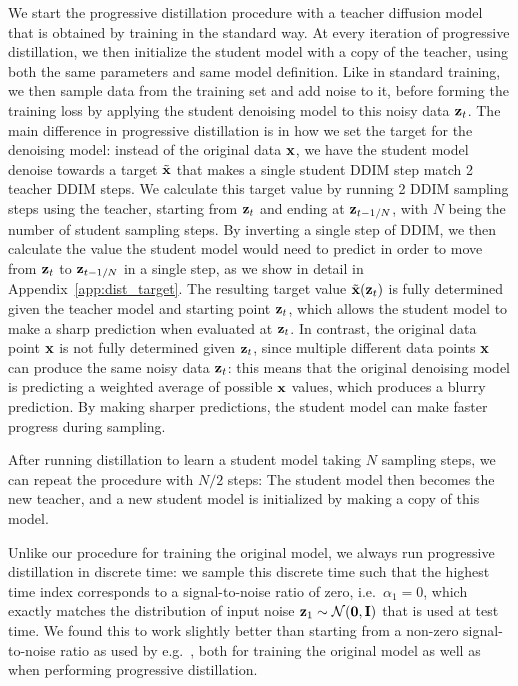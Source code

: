 \documentclass[hidelinks]{article} %
\begin{document}
We start the progressive distillation procedure with a teacher diffusion model that is obtained by training in the standard way. At every iteration of progressive distillation, we then initialize the student model with a copy of the teacher, using both the same parameters and same model definition. Like in standard training, we then sample data from the training set and add noise to it, before forming the training loss by applying the student denoising model to this noisy data ${\mathbf{z}}_t$. The main difference in progressive distillation is in how we set the target for the denoising model: instead of the original data ${\mathbf{x}}$, we have the student model denoise towards a target $\tilde{{\mathbf{x}}}$ that makes a single student DDIM step match 2 teacher DDIM steps. We calculate this target value by running 2 DDIM sampling steps using the teacher, starting from ${\mathbf{z}}_t$ and ending at ${\mathbf{z}}_{t-1/N}$, with $N$ being the number of student sampling steps. By inverting a single step of DDIM, we then calculate the value the student model would need to predict in order to move from ${\mathbf{z}}_t$ to ${\mathbf{z}}_{t-1/N}$ in a single step, as we show in detail in Appendix~\ref{app:dist_target}. The resulting target value $\tilde{{\mathbf{x}}}({\mathbf{z}}_t)$ is fully determined given the teacher model and starting point ${\mathbf{z}}_t$, which allows the student model to make a sharp prediction when evaluated at ${\mathbf{z}}_t$. In contrast, the original data point ${\mathbf{x}}$ is not fully determined given ${\mathbf{z}}_t$, since multiple different data points ${\mathbf{x}}$ can produce the same noisy data ${\mathbf{z}}_t$: this means that the original denoising model is predicting a weighted average of possible ${\mathbf{x}}$ values, which produces a blurry prediction. By making sharper predictions, the student model can make faster progress during sampling.

After running distillation to learn a student model taking $N$ sampling steps, we can repeat the procedure with $N/2$ steps: The student model then becomes the new teacher, and a new student model is initialized by making a copy of this model.

Unlike our procedure for training the original model, we always run progressive distillation in discrete time: we sample this discrete time such that the highest time index corresponds to a signal-to-noise ratio of zero, i.e.\ $\alpha_{1} = 0$, which exactly matches the distribution of input noise $\mathbf{z}_1 \sim \mathcal{N}(\mathbf{0}, \mathbf{I})$ that is used at test time. We found this to work slightly better than starting from a non-zero signal-to-noise ratio as used by e.g.\ \cite{ho2020denoising}, both for training the original model as well as when performing progressive distillation.
\end{document}
